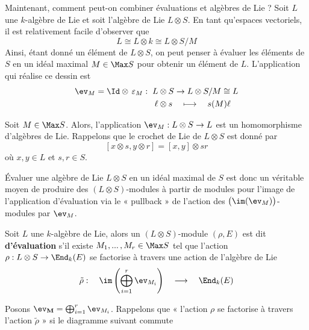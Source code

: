 Maintenant, comment peut-on combiner évaluations et algèbres de Lie ? Soit $L$ une $k$-algèbre de Lie et soit l'algèbre de Lie $L \otimes S$. En tant qu'espaces vectoriels, il est relativement facile d'observer que
$$ L \cong L \otimes k \cong L \otimes S/M $$
Ainsi, étant donné un élément de $L \otimes S$, on peut penser à évaluer les éléments de $S$ en un idéal maximal $M \in \Max S$ pour obtenir un élément de $L$. L'application qui réalise ce dessin est
\begin{align*}
\ev_M = \Id \otimes \, \varepsilon_M : \; L &\otimes S \rightarrow L \otimes S/M \cong L \\
\ell &\otimes s \quad \longmapsto \quad s(M)\ell
\end{align*}

\begin{Rem} Soit $M \in \Max S$. Alors, l'application $\ev_M : L \otimes S \rightarrow L$ est un homomorphisme d'algèbres de Lie. Rappelons que le crochet de Lie de $L \otimes S$ est donné par 
$$ [x \otimes s,y \otimes r] = [x,y] \otimes sr $$
où $x, y \in L$ et $s,r \in S$.
\end{Rem}

Évaluer une algèbre de Lie $L \otimes S$ en un idéal maximal de $S$ est donc un véritable moyen de produire des $(L \otimes S)$-modules à partir de modules pour l'image de l'application d'évaluation via le \linebreak « pullback » de l'action des $\big(\im(\ev_M)\big)$-modules par $\ev_M$.

\begin{Def} Soit $L$ une $k$-algèbre de Lie, alors un $(L \otimes S)$-module $(\rho,E)$ est dit \textbf{d'évaluation} s'il existe $M_1,...\,,M_r \in \Max S$ tel que l'action $\rho : L \otimes S \rightarrow \End_k(E)$ se factorise à travers une action de l'algèbre de Lie
$$ \tilde{\rho} : \quad \im\left(\bigoplus_{i=1}^r \ev_{M_i}\right) \quad \longrightarrow \quad \End_k(E) $$

Posons $\ev_\mathbf{M} = \bigoplus_{i=1}^r \ev_{M_i}$. Rappelons que « l'action $\rho$ se factorise à travers l'action $\tilde{\rho}$ » si le diagramme suivant commute
\begin{center} \end{center}
\end{Def}

